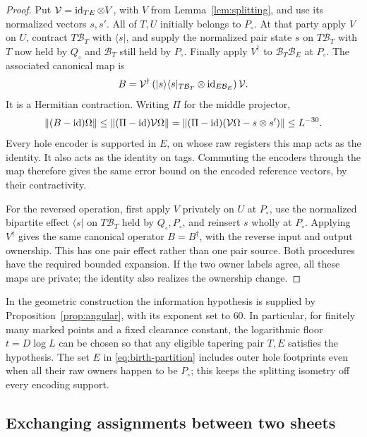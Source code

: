 \begin{proof}
Put $\mathcal V=\operatorname{id}_{TE}\otimes V$, with $V$ from
Lemma~\ref{lem:splitting}, and use its normalized vectors $s,s'$.  All of
$T,U$ initially belongs to $P_\circ$.  At that party apply $V$ on $U$,
contract $T\mathcal B_T$ with $\langle s|$, and supply the normalized pair
state $s$ on $T\mathcal B_T$ with $T$ now held by $Q_\circ$ and
$\mathcal B_T$ still held by $P_\circ$.  Finally apply $V^{\dagger}$ to
$\mathcal B_T\mathcal B_E$ at $P_\circ$.  The associated canonical map is
\begin{equation}\label{eq:birth-map}
 B=\mathcal V^{\dagger}
       \left(|s\rangle\langle s|_{T\mathcal B_T}
                            \otimes\operatorname{id}_{E\mathcal B_E}\right)
          \mathcal V.
\end{equation}
It is a Hermitian contraction.  Writing $\Pi$ for the middle projector,
\[
 \lVert (B-\operatorname{id})\Omega\rVert
   \le\lVert (\Pi-\operatorname{id})\mathcal V\Omega\rVert
   =\lVert (\Pi-\operatorname{id})(\mathcal V\Omega-s\otimes s')\rVert
   \le L^{-30}.
\]
Every hole encoder is supported in $E$, on whose raw registers this map
acts as the identity.  It also acts as the identity on tags.  Commuting the
encoders through the map therefore gives the same error bound on the
encoded reference vectors, by their contractivity.

For the reversed operation, first apply $V$ privately on $U$ at
$P_\circ$, use the normalized bipartite effect $\langle s|$ on
$T\mathcal B_T$ held by $Q_\circ,P_\circ$, and reinsert $s$ wholly at
$P_\circ$.  Applying $V^{\dagger}$ gives the same canonical operator
$B=B^{\dagger}$, with the reverse input and output ownership.  This has
one pair effect rather than one pair source.  Both procedures have the
required bounded expansion.  If the two owner labels agree, all these
maps are private; the identity also realizes the ownership change.
\end{proof}

In the geometric construction the information hypothesis is supplied by
Proposition~\ref{prop:angular}, with its exponent set to $60$.  In
particular, for finitely many marked points and a fixed clearance constant,
the logarithmic floor $t=D\log L$ can be chosen so that any eligible
tapering pair $T,E$ satisfies the hypothesis.  The set $E$ in
\eqref{eq:birth-partition} includes outer hole footprints even when all
their raw owners happen to be $P_\circ$; this keeps the splitting isometry
off every encoding support.

\subsection{Exchanging assignments between two sheets}

